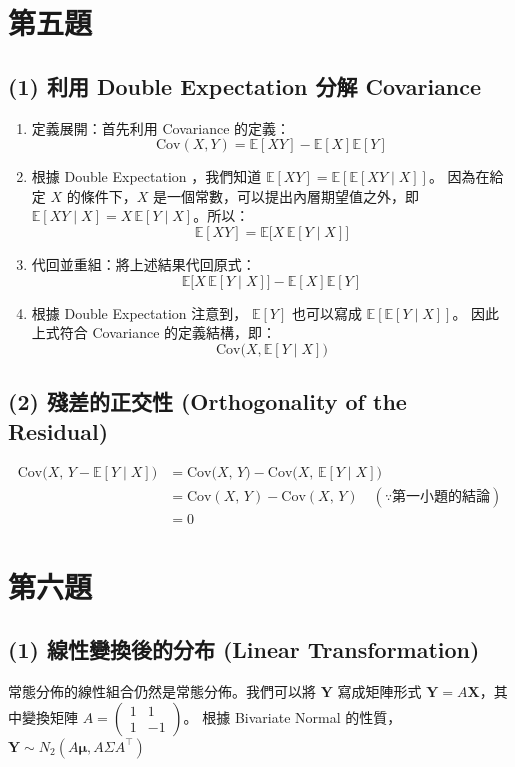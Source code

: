 \documentclass{article}
\begin{document}
\hrulefill

\section*{第五題}
\subsection*{(1) 利用 Double Expectation 分解 Covariance} 
\begin{enumerate}
    \item 定義展開：首先利用 Covariance 的定義：
    $$\mathrm{Cov}(X,Y) = \mathbb{E}[XY] - \mathbb{E}[X]\mathbb{E}[Y]$$
    \item 根據 Double Expectation ，我們知道 $\mathbb{E}[XY] = \mathbb{E}[\mathbb{E}[XY \mid X]]$。
    因為在給定 $X$ 的條件下，$X$ 是一個常數，可以提出內層期望值之外，即 
    $\mathbb{E}[XY \mid X] = X\,\mathbb{E}[Y \mid X]$。所以：
    $$\mathbb{E}[XY] = \mathbb{E}\!\big[X\,\mathbb{E}[Y\mid X]\big]$$
    \item 代回並重組：將上述結果代回原式：
    $$\mathbb{E}\!\big[X\,\mathbb{E}[Y\mid X]\big] - \mathbb{E}[X]\mathbb{E}[Y]$$
    \item 根據 Double Expectation 注意到， $\mathbb{E}[Y]$ 也可以寫成 $\mathbb{E}[\mathbb{E}[Y \mid X]]$。
    因此上式符合 Covariance 的定義結構，即：
    $$\mathrm{Cov}\!\big(X,\mathbb{E}[Y\mid X]\big)$$
\end{enumerate}
\subsection*{(2) 殘差的正交性 (Orthogonality of the Residual)}
\begin{align*}
    \mathrm{Cov}\!\big(X,\,Y-\mathbb{E}[Y\mid X]\big)&=
    \mathrm{Cov}\!\big(X,\,Y)-\mathrm{Cov}\!\big(X,\,\mathbb{E}[Y\mid X]\big)\\
    &=\mathrm{Cov}(X,\,Y)-\mathrm{Cov}(X,\,Y) \quad (\because \text{第一小題的結論})\\
    &= 0
\end{align*}

\hrulefill

\section*{第六題}
\subsection*{(1) 線性變換後的分布 (Linear Transformation)}
常態分佈的線性組合仍然是常態分佈。我們可以將 $\bm Y$ 寫成矩陣形式 $\bm Y = A\bm X$，其中變換矩陣 
$A = \begin{pmatrix}1 & 1 \\ 1 & -1\end{pmatrix}$。
根據 Bivariate Normal 的性質，$\bm Y \sim N_2(A\bm\mu, A\Sigma A^\top)$
\end{document}
